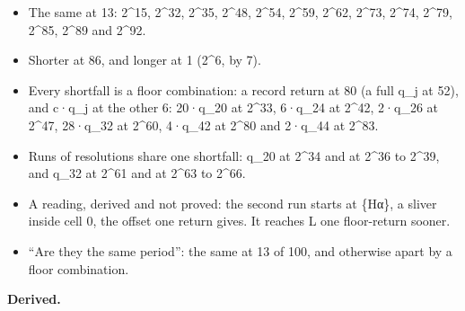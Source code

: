 \begin{itemize}
\begin{itemize}
\item The same at 13: 2\textasciicircum{}15, 2\textasciicircum{}32, 2\textasciicircum{}35, 2\textasciicircum{}48, 2\textasciicircum{}54, 2\textasciicircum{}59, 2\textasciicircum{}62, 2\textasciicircum{}73, 2\textasciicircum{}74, 2\textasciicircum{}79, 2\textasciicircum{}85, 2\textasciicircum{}89 and 2\textasciicircum{}92.
\item Shorter at 86, and longer at 1 (2\textasciicircum{}6, by 7).
\item Every shortfall is a floor combination: a record return at 80 (a full q\_\allowbreak{}j at 52), and c·q\_\allowbreak{}j at the other 6: 20·q\_\allowbreak{}20 at 2\textasciicircum{}33, 6·q\_\allowbreak{}24 at 2\textasciicircum{}42, 2·q\_\allowbreak{}26 at 2\textasciicircum{}47, 28·q\_\allowbreak{}32 at 2\textasciicircum{}60, 4·q\_\allowbreak{}42 at 2\textasciicircum{}80 and 2·q\_\allowbreak{}44 at 2\textasciicircum{}83.
\item Runs of resolutions share one shortfall: q\_\allowbreak{}20 at 2\textasciicircum{}34 and at 2\textasciicircum{}36 to 2\textasciicircum{}39, and q\_\allowbreak{}32 at 2\textasciicircum{}61 and at 2\textasciicircum{}63 to 2\textasciicircum{}66.
\item A reading, derived and not proved: the second run starts at \{Hα\}, a sliver inside cell 0, the offset one return gives. It reaches L one floor-return sooner.
\item “Are they the same period”: the same at 13 of 100, and otherwise apart by a floor combination.
\end{itemize}
\end{itemize}

\textbf{Derived.}

